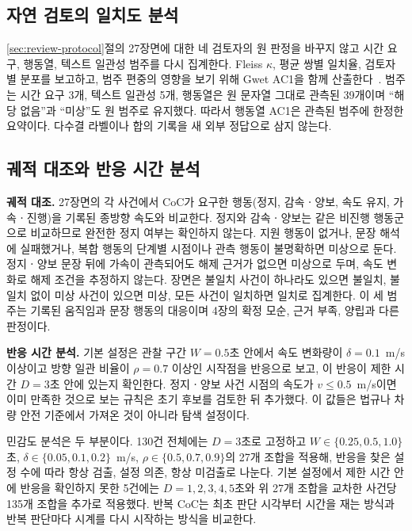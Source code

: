 \begin{revision}
\subsection{자연 검토의 일치도 분석}
\label{sec:human-design}
\ref{sec:review-protocol}절의 27장면에 대한 네 검토자의 원 판정을 바꾸지 않고 시간 요구, 행동열, 텍스트 일관성 범주를 다시 집계한다. Fleiss $\kappa$, 평균 쌍별 일치율, 검토자별 분포를 보고하고, 범주 편중의 영향을 보기 위해 Gwet AC1을 함께 산출한다~\cite{gwet2008agreement}. 범주는 시간 요구 3개, 텍스트 일관성 5개, 행동열은 원 문자열 그대로 관측된 39개이며 ``해당 없음''과 ``미상''도 원 범주로 유지했다. 따라서 행동열 AC1은 관측된 범주에 한정한 요약이다. 다수결 라벨이나 합의 기록을 새 외부 정답으로 삼지 않는다.

\subsection{궤적 대조와 반응 시간 분석}
\label{sec:aux-design}
\textbf{궤적 대조.} 27장면의 각 사건에서 CoC가 요구한 행동(정지, 감속ㆍ양보, 속도 유지, 가속ㆍ진행)을 기록된 종방향 속도와 비교한다. 정지와 감속ㆍ양보는 같은 비진행 행동군으로 비교하므로 완전한 정지 여부는 확인하지 않는다. 지원 행동이 없거나, 문장 해석에 실패했거나, 복합 행동의 단계별 시점이나 관측 행동이 불명확하면 미상으로 둔다. 정지ㆍ양보 문장 뒤에 가속이 관측되어도 해제 근거가 없으면 미상으로 두며, 속도 변화로 해제 조건을 추정하지 않는다. 장면은 불일치 사건이 하나라도 있으면 불일치, 불일치 없이 미상 사건이 있으면 미상, 모든 사건이 일치하면 일치로 집계한다. 이 세 범주는 기록된 움직임과 문장 행동의 대응이며 4장의 확정 모순, 근거 부족, 양립과 다른 판정이다.

\textbf{반응 시간 분석.} 기본 설정은 관찰 구간 $W=0.5$초 안에서 속도 변화량이 $\delta=0.1$~m/s 이상이고 방향 일관 비율이 $\rho=0.7$ 이상인 시작점을 반응으로 보고, 이 반응이 제한 시간 $D=3$초 안에 있는지 확인한다. 정지ㆍ양보 사건 시점의 속도가 $v\leq0.5$~m/s이면 이미 만족한 것으로 보는 규칙은 초기 후보를 검토한 뒤 추가했다. 이 값들은 법규나 차량 안전 기준에서 가져온 것이 아니라 탐색 설정이다.

민감도 분석은 두 부분이다. 130건 전체에는 $D=3$초로 고정하고 $W\in\{0.25,0.5,1.0\}$초, $\delta\in\{0.05,0.1,0.2\}$~m/s, $\rho\in\{0.5,0.7,0.9\}$의 27개 조합을 적용해, 반응을 찾은 설정 수에 따라 항상 검출, 설정 의존, 항상 미검출로 나눈다. 기본 설정에서 제한 시간 안에 반응을 확인하지 못한 5건에는 $D=1,2,3,4,5$초와 위 27개 조합을 교차한 사건당 135개 조합을 추가로 적용했다. 반복 CoC는 최초 판단 시각부터 시간을 재는 방식과 반복 판단마다 시계를 다시 시작하는 방식을 비교한다.
\end{revision}
